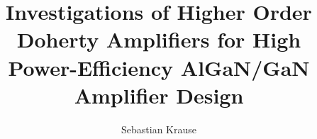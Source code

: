 \documentclass[master, english]{ihethesis}
\begin{document}
\title{Investigations of Higher Order Doherty Amplifiers for High Power\hbox{-}Efficiency AlGaN/GaN Amplifier Design}
\author{Sebastian Krause}



\maketitle
{}
\cleardoublepage
\newpage
\thispagestyle{empty}


\tableofcontents

\printglossaries



\printnomenclature


\listoffigures
\listoftables

\cleardoublepage
\setcounter{page}{1}







%

\cleardoublepage
\clearpage
{}





\printnomenclature
\cleardoublepage

\makeiheabstract





\end{document}
